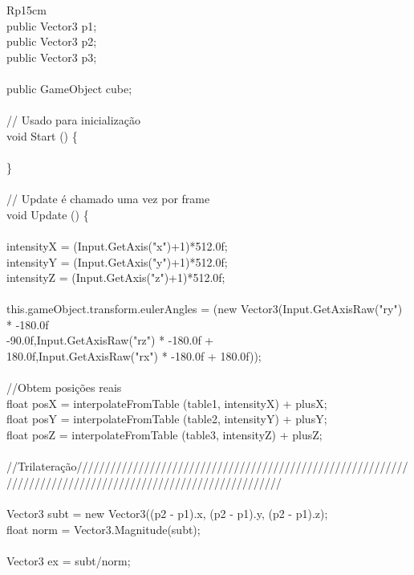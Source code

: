 \begin{longtable}{Rp{15cm}}
\\    
\quad	public Vector3 p1;
\\    
\quad	public Vector3 p2;
\\    
\quad	public Vector3 p3;
\\
\\
\quad public GameObject cube;
\\
\\
\quad	// Usado para inicialização
\\    
\quad	void Start () \{
\\
\\
\quad	\}
\\
\\
\quad	// Update é chamado uma vez por frame
\\
\quad	void Update () \{
\\
\\
\quad \quad intensityX = (Input.GetAxis("x")+1)*512.0f;
\\
\quad \quad intensityY = (Input.GetAxis("y")+1)*512.0f;
\\
\quad \quad intensityZ = (Input.GetAxis("z")+1)*512.0f;
\\
\\
\quad \quad this.gameObject.transform.eulerAngles = (new Vector3(Input.GetAxisRaw("ry") * -180.0f
\\ \quad \quad -90.0f,Input.GetAxisRaw("rz") * -180.0f +
\\ \quad \quad 180.0f,Input.GetAxisRaw("rx") * -180.0f + 180.0f));
\\
\\
\quad \quad //Obtem posições reais
\\
\quad \quad float posX = interpolateFromTable (table1, intensityX) + plusX;
\\
\quad \quad float posY = interpolateFromTable (table2, intensityY) + plusY;
\\
\quad \quad float posZ = interpolateFromTable (table3, intensityZ) + plusZ;
\\
\\
\quad \quad //Trilateração////////////////////////////////////////////////////////////////////////////////////////////////////////////
\\
\\
\quad \quad	Vector3 subt = new Vector3((p2 - p1).x, (p2 - p1).y, (p2 - p1).z);
\\
\quad \quad float norm = Vector3.Magnitude(subt);
\\
\\
\quad \quad Vector3 ex = subt/norm;

\end{longtable}
